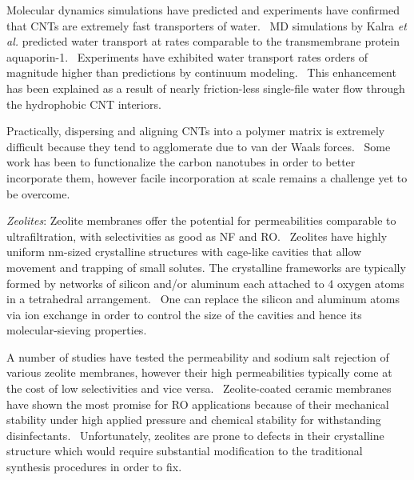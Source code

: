   Molecular dynamics simulations have predicted and experiments have confirmed that 
  CNTs are extremely fast transporters of water.~\cite{hummer_water_2001,joseph_why_2008}
  MD simulations by Kalra \textit{et al.} predicted water transport at rates comparable
  to the transmembrane protein aquaporin-1.~\cite{kalra_osmotic_2003} Experiments have 
  exhibited water transport rates orders of magnitude higher than predictions by 
  continuum modeling.~\cite{holt_fast_2006} This enhancement has been explained as a 
  result of nearly friction-less single-file water flow through the hydrophobic CNT 
  interiors.~\cite{kalra_osmotic_2003}
  
  Practically, dispersing and aligning CNTs into a polymer matrix is extremely
  difficult because they tend to agglomerate due to van der Waals forces.~\cite{sahoo_polymer_2010}
  Some work has been to functionalize the carbon nanotubes in order to better incorporate 
  them, however facile incorporation at scale remains a challenge yet to be overcome.~\cite{kim_polysulfone_2007}
  
  \textit{Zeolites}: Zeolite membranes offer the potential for permeabilities 
  comparable to ultrafiltration, with selectivities as good as NF and RO.~\cite{hoek_nanotechnology-based_2014}
  Zeolites have highly uniform nm-sized crystalline structures with cage-like
  cavities that allow movement and trapping of small solutes. The crystalline 
  frameworks are typically formed by networks of silicon and/or aluminum each 
  attached to 4 oxygen atoms in a tetrahedral arrangement.~\cite{auerbach_handbook_2003}
  One can replace the silicon and aluminum atoms via ion exchange in order
  to control the size of the cavities and hence its molecular-sieving properties.~\cite{li_novel_2007}
 
  A number of studies have tested the permeability and sodium salt rejection
  of various zeolite membranes, however their high permeabilities typically come
  at the cost of low selectivities and vice versa.~\cite{li_desalination_2004,duke_seawater_2009}
  Zeolite-coated ceramic membranes have shown the most promise for RO applications
  because of their mechanical stability under high applied pressure and chemical
  stability for withstanding disinfectants.~\cite{pendergast_review_2011}
  Unfortunately, zeolites are prone to defects in their crystalline structure which 
  would require substantial modification to the traditional synthesis procedures
  in order to fix.~\cite{kumakiri_application_2000}

